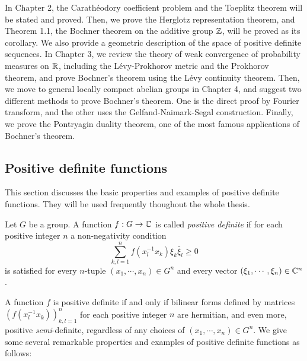 \documentclass[a4paper]{article}
\begin{document}
In Chapter 2, the Carath\'eodory coefficient problem and the Toeplitz theorem will be stated and proved.
Then, we prove the Herglotz representation theorem, and Theorem 1.1, the Bochner theorem on the additive group $\mathbb{Z}$, will be proved as its corollary.
We also provide a geometric description of the space of positive definite sequences.
In Chapter 3, we review the theory of weak convergence of probability measures on $\mathbb{R}$, including the L\'evy-Prokhorov metric and the Prokhorov theorem, and prove Bochner's theorem using the L\'evy continuity theorem.
Then, we move to general locally compact abelian groups in Chapter 4, and suggest two different methods to prove Bochner's theorem.
One is the direct proof by Fourier transform, and the other uses the Gelfand-Naimark-Segal construction.
Finally, we prove the Pontryagin duality theorem, one of the most famous applications of Bochner's theorem.





\subsection{Positive definite functions}
This section discusses the basic properties and examples of positive definite functions.
They will be used frequently thoughout the whole thesis.

\begin{defn}
Let $G$ be a group.
A function $f:G\to\mathbb{C}$ is called \emph{positive definite} if for each positive integer $n$ a non-negativity condition
\[\sum_{k,l=1}^nf(x_l^{-1}x_k)\xi_k\bar\xi_l\ge0\]
is satisfied for every $n$-tuple $(x_1,\cdots,x_n)\in G^n$ and every vector $(\xi_1,\cdots,\xi_n)\in\mathbb{C}^n$.
\end{defn}
A function $f$ is positive definite if and only if bilinear forms defined by matrices $(f(x_l^{-1}x_k))_{k,l=1}^n$ for each positive integer $n$ are hermitian, and even more, positive \emph{semi}-definite, regardless of any choices of $(x_1,\cdots,x_n)\in G^n$.
We give some several remarkable properties and examples of positive definite functions as follows:
\end{document}

